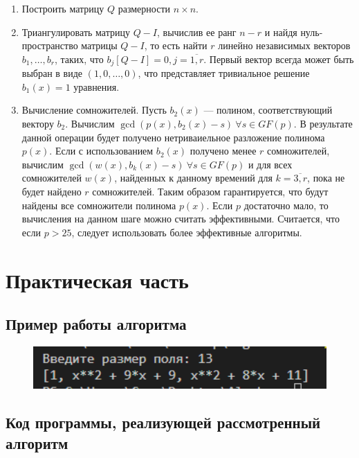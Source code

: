 \documentclass[bachelor, och, labwork]{shiza}
\begin{document}
\begin{enumerate}
   \item Построить матрицу $Q$ размерности $n \times n$. 
   \item Триангулировать матрицу $Q-I$, вычислив ее ранг $n-r$ и найдя нуль-пространство
   матрицы $Q-I$, то есть найти $r$ линейно независимых векторов $b_1, \dots, b_r$,
   таких, что $b_j[Q-I]=0, j=\overline{1, r}$. Первый вектор всегда может быть
   выбран в виде $\left(1, 0, \dots, 0\right)$, что представляет тривиальное
   решение $b_1(x)=1$ уравнения.
   \item Вычисление сомножителей. Пусть $b_2(x)$ --- полином, соответствующий
   вектору $b_2$. Вычислим $\gcd(p(x), b_2(x)-s) ~ \forall s \in GF(p).$
   В результате данной операции будет получено нетриваиельное разложение
   полинома $p(x)$. Если с использованием $b_2(x)$ получено менее $r$ сомножителей,
   вычислим $\gcd(w(x), b_k(x) - s) ~\forall s \in GF(p)$ и для всех сомножителей
   $w(x)$, найденных к данному времений для $k = \overline{3, r}$, пока не будет
   найдено $r$ сомножителей. Таким образом гарантируется, что будут найдены все
   сомножители полинома $p(x)$. Если $p$ достаточно мало, то вычисления на данном
   шаге можно считать эффективными. Считается, что если $p > 25$, следует
   использовать более эффективные алгоритмы.
\end{enumerate}


\section{Практическая часть}
\subsection{Пример работы алгоритма}
\begin{figure}[H]
    \centering
    \includegraphics[width=1\textwidth]{pic1.png}
    \caption{}
\end{figure}


    \subsection{Код программы, реализующей рассмотренный алгоритм}
        \inputminted{python}{lab18.py}
\end{document}
